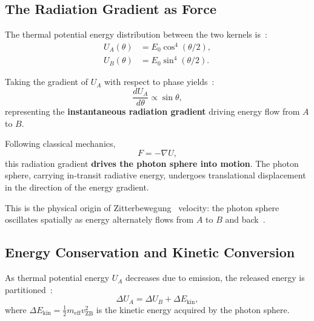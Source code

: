\documentclass[12pt,letterpaper]{article}
\begin{document}
\subsection{The Radiation Gradient as Force}

The thermal potential energy distribution between the two kernels is~\cite{hanamura16759284,hanamura18356895}:
\begin{align}
U_A(\theta) &= E_0 \cos^4(\theta/2), \\
U_B(\theta) &= E_0 \sin^4(\theta/2).
\end{align}

Taking the gradient of $U_A$ with respect to phase yields~\cite{hanamura18356895}:
\begin{equation}
\frac{dU_A}{d\theta} \propto \sin\theta,
\end{equation}
representing the \textbf{instantaneous radiation gradient} driving energy flow from $A$ to $B$.

Following classical mechanics,
\begin{equation}
F = -\nabla U,
\end{equation}
this radiation gradient \textbf{drives the photon sphere into motion}. The photon sphere, carrying in-transit radiative energy, undergoes translational displacement in the direction of the energy gradient.

This is the physical origin of Zitterbewegung~\cite{Schrodinger1930} velocity: the photon sphere oscillates spatially as energy alternately flows from $A$ to $B$ and back~\cite{hanamura18356895}.

\subsection{Energy Conservation and Kinetic Conversion}

As thermal potential energy $U_A$ decreases due to emission, the released energy is partitioned~\cite{hanamura17765017}:
\begin{equation}
\Delta U_A = \Delta U_B + \Delta E_{\mathrm{kin}},
\end{equation}
where $\Delta E_{\mathrm{kin}} = \frac{1}{2} m_{\mathrm{eff}} v_{\mathrm{ZB}}^2$ is the kinetic energy acquired by the photon sphere.
\end{document}
